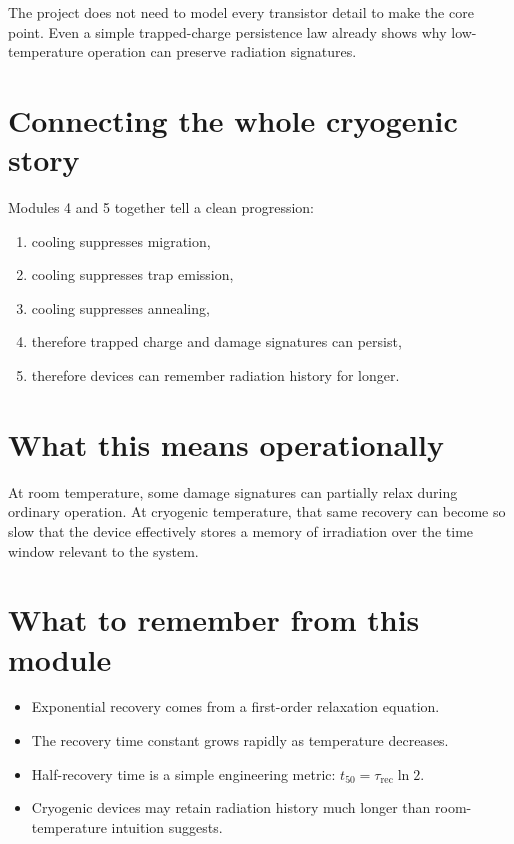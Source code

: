 \documentclass[11pt]{article}
\begin{document}
The project does not need to model every transistor detail to make the core point. Even a simple trapped-charge persistence law already shows why low-temperature operation can preserve radiation signatures.

\section{Connecting the whole cryogenic story}
Modules 4 and 5 together tell a clean progression:
\begin{enumerate}[label=\arabic*.]
    \item cooling suppresses migration,
    \item cooling suppresses trap emission,
    \item cooling suppresses annealing,
    \item therefore trapped charge and damage signatures can persist,
    \item therefore devices can remember radiation history for longer.
\end{enumerate}

\section{What this means operationally}
At room temperature, some damage signatures can partially relax during ordinary operation. At cryogenic temperature, that same recovery can become so slow that the device effectively stores a memory of irradiation over the time window relevant to the system.

\section{What to remember from this module}
\begin{itemize}
    \item Exponential recovery comes from a first-order relaxation equation.
    \item The recovery time constant grows rapidly as temperature decreases.
    \item Half-recovery time is a simple engineering metric: $t_{50}=\tau_{\mathrm{rec}}\ln 2$.
    \item Cryogenic devices may retain radiation history much longer than room-temperature intuition suggests.
\end{itemize}
\end{document}
